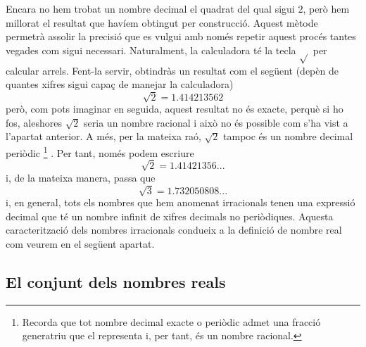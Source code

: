 Encara no hem trobat un nombre decimal el quadrat del qual sigui $2$, però
hem millorat el resultat que havíem obtingut per construcció.
Aquest mètode permetrà assolir la precisió que es vulgui amb
només repetir aquest procés tantes vegades com sigui necessari. Naturalment, la
calculadora té la tecla $\sqrt{}$ per calcular arrels. Fent-la servir, obtindràs un resultat com el següent (depèn de quantes
xifres sigui capaç de manejar la calculadora)%
\begin{equation*}
\sqrt{2}=1.414213562
\end{equation*}%
però, com pots imaginar en seguida, aquest resultat no és exacte, perquè
si ho fos, aleshores $\sqrt{2}$ seria un nombre racional i això no
és possible com s’ha vist a l’apartat anterior. A més, per la
mateixa raó, $\sqrt{2}$ tampoc és un nombre decimal periòdic%
\footnote{%
Recorda que tot nombre decimal exacte o periòdic admet una fracció generatriu que el representa i, per tant, és un nombre racional.}%
. Per tant, només podem escriure%
\begin{equation*}
\sqrt{2}=1.41421356...
\end{equation*}%
i, de la mateixa manera, passa que%
\begin{equation*}
\sqrt{3}=1.732050808...
\end{equation*}%
i, en general, tots els nombres que hem anomenat irracionals
tenen una expressió decimal que té un nombre infinit de xifres
decimals no periòdiques. Aquesta caracterització dels nombres
irracionals condueix a la definició de nombre real com veurem en
el següent apartat.

\subsection{El conjunt dels nombres reals}

